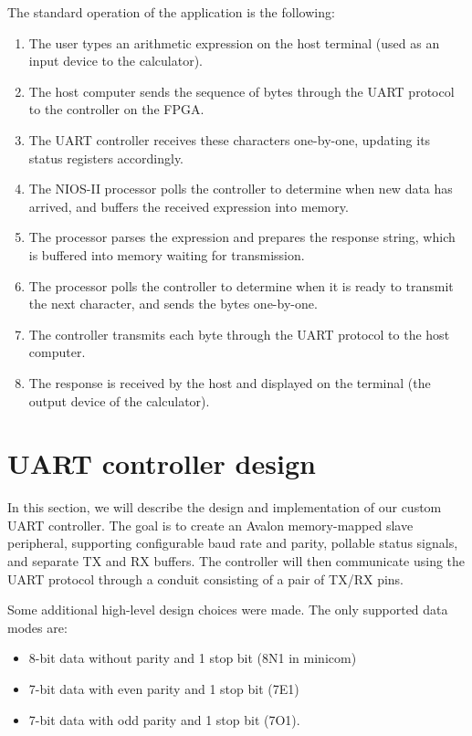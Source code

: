 \documentclass[12pt,a4paper]{article}
\begin{document}
The standard operation of the application is the following:
\begin{enumerate}[nosep]
	\item The user types an arithmetic expression on the host terminal (used as an input device to the calculator).
	\item The host computer sends the sequence of bytes through the UART protocol to the controller on the FPGA.
	\item The UART controller receives these characters one-by-one, updating its status registers accordingly.
	\item The NIOS-II processor polls the controller to determine when new data has arrived, and buffers the received expression into memory.
	\item The processor parses the expression and prepares the response string, which is buffered into memory waiting for transmission.
	\item The processor polls the controller to determine when it is ready to transmit the next character, and sends the bytes one-by-one.
	\item The controller transmits each byte through the UART protocol to the host computer.
	\item The response is received by the host and displayed on the terminal (the output device of the calculator).
\end{enumerate}


\section{UART controller design}

In this section, we will describe the design and implementation of our custom UART controller. The goal is to create an Avalon memory-mapped slave peripheral, supporting configurable baud rate and parity, pollable status signals, and separate TX and RX buffers. The controller will then communicate using the UART protocol through a conduit consisting of a pair of TX/RX pins.

Some additional high-level design choices were made. The only supported data modes are:
\begin{itemize}[nosep]
	\item 8-bit data without parity and 1 stop bit (8N1 in minicom)
	\item 7-bit data with even parity and 1 stop bit (7E1)
	\item 7-bit data with odd parity and 1 stop bit (7O1).
\end{itemize}
\end{document}

